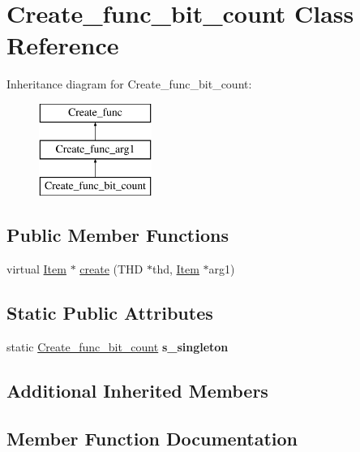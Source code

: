 \hypertarget{classCreate__func__bit__count}{}\section{Create\+\_\+func\+\_\+bit\+\_\+count Class Reference}
\label{classCreate__func__bit__count}
Inheritance diagram for Create\+\_\+func\+\_\+bit\+\_\+count\+:\begin{figure}[H]
\begin{center}
\leavevmode
\includegraphics[height=3.000000cm]{classCreate__func__bit__count}
\end{center}
\end{figure}
\subsection*{Public Member Functions}
\begin{DoxyCompactItemize}
\item 
virtual \mbox{\hyperlink{classItem}{Item}} $\ast$ \mbox{\hyperlink{classCreate__func__bit__count_acae2bf863d16a55a47fe08b8dafcb808}{create}} (T\+HD $\ast$thd, \mbox{\hyperlink{classItem}{Item}} $\ast$arg1)
\end{DoxyCompactItemize}
\subsection*{Static Public Attributes}
\begin{DoxyCompactItemize}
\item 
\mbox{\label{classCreate__func__bit__count_a4a24f9b77226925d6106e41dc06670f2}} 
static \mbox{\hyperlink{classCreate__func__bit__count}{Create\+\_\+func\+\_\+bit\+\_\+count}} {\bfseries s\+\_\+singleton}
\end{DoxyCompactItemize}
\subsection*{Additional Inherited Members}


\subsection{Member Function Documentation}
\mbox{\label{classCreate__func__bit__count_acae2bf863d16a55a47fe08b8dafcb808}} 
